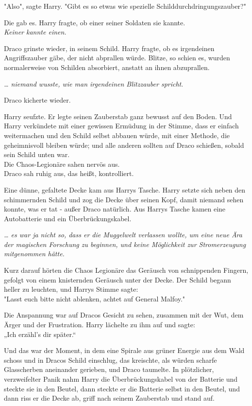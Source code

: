 {"Also", sagte Harry. "Gibt es so etwas wie spezielle Schilddurchdringungszauber?"

Die gab es. Harry fragte, ob einer seiner Soldaten sie kannte.\\ \emph{Keiner kannte einen.}

Draco grinste wieder, in seinem Schild. Harry fragte, ob es irgendeinen Angriffszauber gäbe, der nicht abprallen würde. Blitze, so schien es, wurden normalerweise von Schilden absorbiert, anstatt an ihnen abzuprallen.

\emph{… niemand wusste, wie man irgendeinen Blitzzauber spricht}.

Draco kicherte wieder.

Harry seufzte. Er legte seinen Zauberstab ganz bewusst auf den Boden. Und Harry verkündete mit einer gewissen Ermüdung in der Stimme, dass er einfach weitermachen und den Schild selbst abbauen würde, mit einer Methode, die geheimnisvoll bleiben würde; und alle anderen sollten auf Draco schießen, sobald sein Schild unten war.\\ Die Chaos-Legionäre sahen nervös aus.\\ Draco sah ruhig aus, das heißt, kontrolliert.

Eine dünne, gefaltete Decke kam aus Harrys Tasche. Harry setzte sich neben den schimmernden Schild und zog die Decke über seinen Kopf, damit niemand sehen konnte, was er tat - außer Draco natürlich. Aus Harrys Tasche kamen eine Autobatterie und ein Überbrückungskabel.

\emph{… es war ja nicht so, dass er die Muggelwelt verlassen wollte, um eine neue Ära der magischen Forschung zu beginnen, und keine Möglichkeit zur Stromerzeugung mitgenommen hätte.}

Kurz darauf hörten die Chaos Legionäre das Geräusch von schnippenden Fingern, gefolgt von einem knisternden Geräusch unter der Decke. Der Schild begann heller zu leuchten, und Harrys Stimme sagte:\\ "Lasst euch bitte nicht ablenken, achtet auf General Malfoy."

Die Anspannung war auf Dracos Gesicht zu sehen, zusammen mit der Wut, dem Ärger und der Frustration. Harry lächelte zu ihm auf und sagte:\\ „Ich erzähl's dir später.“

Und das war der Moment, in dem eine Spirale aus grüner Energie aus dem Wald schoss und in Dracos Schild einschlug, das kreischte, als würden scharfe Glasscherben aneinander gerieben, und Draco taumelte. In plötzlicher, verzweifelter Panik nahm Harry die Überbrückungskabel von der Batterie und steckte sie in den Beutel, dann steckte er die Batterie selbst in den Beutel, und dann riss er die Decke ab, griff nach seinem Zauberstab und stand auf.

}
